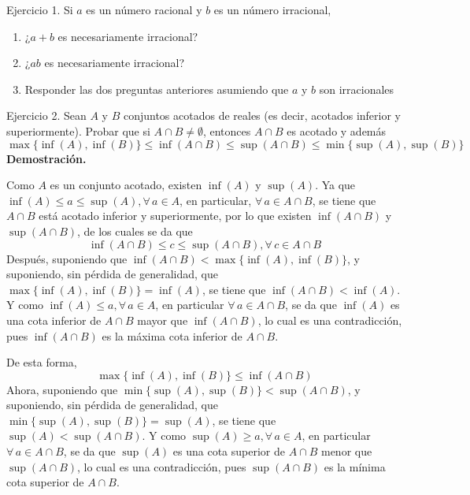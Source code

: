 \documentclass[fleqn]{article}
\begin{document}
    Ejercicio 1. Si $ a $ es un número racional y $ b $ es un número irracional, 

    \begin{enumerate}
        \item ¿$ a + b $ es necesariamente irracional? 

        \item ¿$ ab $ es necesariamente irracional?

        \item Responder las dos preguntas anteriores asumiendo que $ a $ y $ b $ son irracionales
    \end{enumerate}



    Ejercicio 2. Sean $ A $ y $ B $ conjuntos acotados de reales (es decir, acotados inferior y superiormente). Probar que si $ A \cap B \neq \emptyset $, entonces $ A \cap B $ es acotado y además 
    $$ \max \lbrace \inf (A), \inf(B) \rbrace \leq \inf(A \cap B) \leq \sup(A \cap B) \leq \min \lbrace \sup (A), \sup(B) \rbrace $$
    \textbf{Demostración.}

    Como $ A $ es un conjunto acotado, existen $ \inf (A) $ y $ \sup (A) $. Ya que $ \inf (A) \leq a \leq \sup (A), \forall \, a \in A $, en particular, $ \forall \, a \in A \cap B $, se tiene que $ A \cap B $ está acotado inferior y superiormente, por lo que existen $ \inf (A \cap B) $ y $ \sup (A \cap B) $, de los cuales se da que
    \begin{equation}
        \inf (A \cap B) \leq c \leq \sup (A \cap B), \forall \, c \in A \cap B
        \label{infsup}
    \end{equation}
    Después, suponiendo que $ \inf (A \cap B) < \max \lbrace \inf (A), \inf (B) \rbrace $, y suponiendo, sin pérdida de generalidad, que $ \max \lbrace \inf (A), \inf (B) \rbrace = \inf (A) $, se tiene que $ \inf (A \cap B) < \inf (A) $. Y como $ \inf (A) \leq a, \forall \, a \in A $, en particular $ \forall \, a \in A \cap B $, se da que $ \inf (A) $ es una cota inferior de $ A \cap B $ mayor que $ \inf (A \cap B) $, lo cual es una contradicción, pues $ \inf (A \cap B) $ es la máxima cota inferior de $ A \cap B $.

    De esta forma, 
    \begin{equation}
        \max \lbrace \inf (A), \inf (B) \rbrace \leq \inf (A \cap B)
        \label{maxinf}
    \end{equation}
    Ahora, suponiendo que $ \min \lbrace \sup (A), \sup (B) \rbrace < \sup (A \cap B) $, y suponiendo, sin pérdida de generalidad, que $ \min \lbrace \sup (A), \sup (B) \rbrace = \sup (A) $, se tiene que $ \sup (A) < \sup (A \cap B) $. Y como $ \sup(A) \geq a, \forall \, a \in A $, en particular $ \forall \, a \in A \cap B $, se da que $ \sup (A) $ es una cota superior de $ A \cap B $ menor que $ \sup (A \cap B) $, lo cual es una contradicción, pues $ \sup (A \cap B) $ es la mínima cota superior de $ A \cap B $.
\end{document}
